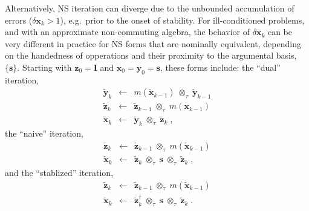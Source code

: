 \documentclass[letterpaper,twocolumn,amsmath,amsfont,amssymb,english,aps,jcp,preprintnumbers,groupaddress,nofootinbib,tightenlines]{revtex4}
\newcommand{\mat}[1]{\boldsymbol{#1}}
\newcommand{\mmat}[1]{\widetilde{\boldsymbol{#1}}}
\newcommand{\ot}{ {\scriptstyle \otimes}_{ \tau } }
\begin{document}
Alternatively, NS iteration can diverge due to the unbounded accumulation of errors ($\delta \mat{x}_k > 1 $), e.g.~prior
to the onset of stability.  For ill-conditioned problems, and with an approximate non-commuting algebra, the 
behavior of $\delta \mat{x}_k $ can be very different in practice for NS forms that are nominally equivalent,
depending on the handedness of opperations and their proximity to the argumental basis, $\{ \mat{s} \}$.  
Starting with $\mat{z}_0=\mat{I}$ and $\mat{x}_0=\mat{y}_0=\mat{s}$, these forms include: the ``dual'' iteration,
\begin{eqnarray} \label{dualsiteration}
\mmat{y}_{k}  &\leftarrow& m \left( \mmat{x}_{k-1} \right) \; \ot \;  \mmat{y}_{k-1}  \\
\mmat{z}_{k}  &\leftarrow& \mmat{z}_{k-1}  \; \ot \;  m \left( \mat{x}_{k-1} \right) \\
\mmat{x}_{k} &\leftarrow& \mmat{y}_{k} \; \ot \; \mmat{z}_{k} \; ,
\end{eqnarray}
the ``naive'' iteration,
\begin{eqnarray}
\mmat{z}_{k}  &\leftarrow& \mmat{z}_{k-1} \; \ot \; m \left( \mmat{x}_{k-1} \right) \\
\mmat{x}_{k} &\leftarrow& \mmat{z}_{k} \; \ot \; \mat{s} \; \ot \; \mmat{z}_{k} \; ,
\end{eqnarray}
and the ``stablized'' iteration,
\begin{eqnarray}
\mmat{z}_{k}  &\leftarrow& \mmat{z}_{k-1}  \; \ot \; m \left( \mmat{x}_{k-1} \right) \\
\mmat{x}_{k} &\leftarrow& \mmat{z}^\dagger_{k} \; \ot \; \mat{s} \; \ot \; \mmat{z}_{k} \; .
\end{eqnarray}
\end{document}
